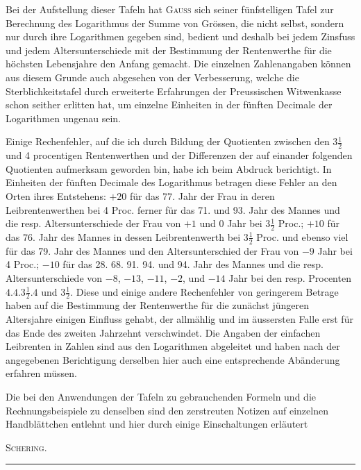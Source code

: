 \noindent\hspace*{1.2em} Bei der Aufstellung dieser Tafeln hat \textsc{Gauss} sich seiner fünfstelligen Tafel zur Berechnung des Logarithmus der Summe von Grössen, die nicht selbst, sondern nur durch ihre Logarithmen gegeben sind, bedient und deshalb bei jedem Zinsfuss und jedem Altersunterschiede mit der Bestimmung der Rentenwerthe für die höchsten Lebensjahre den Anfang gemacht. Die einzelnen Zahlenangaben können aus diesem Grunde auch abgesehen von der Verbesserung, welche die Sterblichkeitstafel durch erweiterte Erfahrungen der Preussischen Witwenkasse schon seither erlitten hat, um einzelne Einheiten in der fünften Decimale der Logarithmen ungenau sein.

Einige Rechenfehler, auf die ich durch Bildung der Quotienten zwischen den \(3\tfrac{1}{2}\) und 4 procentigen Rentenwerthen und der Differenzen der auf einander folgenden Quotienten aufmerksam geworden bin, habe ich beim Abdruck berichtigt. In Einheiten der fünften Decimale des Logarithmus betragen diese Fehler an den Orten ihres Entstehens: \(+20\) für das 77. Jahr der Frau in deren Leibrentenwerthen bei 4 Proc. ferner für das 71. und 93. Jahr des Mannes und die resp. Altersunterschiede der Frau von \(+1\) und 0 Jahr bei \(3\tfrac{1}{2}\) Proc.; \(+10\) für das 76. Jahr des Mannes in dessen Leibrentenwerth bei \(3\tfrac{1}{2}\) Proc. und ebenso viel für das 79. Jahr des Mannes und den Altersunterschied der Frau von \(-9\) Jahr bei 4 Proc.; \(-10\) für das 28. 68. 91. 94. und 94. Jahr des Mannes und die resp. Altersunterschiede von \(-8\), \(-13\), \(-11\), \(-2\), und \(-14\) Jahr bei den resp. Procenten \(4.4.3\tfrac{1}{2}.4\) und \(3\tfrac{1}{2}\). Diese und einige andere Rechenfehler von geringerem Betrage haben auf die Bestimmung der Rentenwerthe für die zunächst jüngeren Altersjahre einigen Einfluss gehabt, der allmählig und im äussersten Falle erst für das Ende des zweiten Jahrzehnt verschwindet. Die Angaben der einfachen Leibrenten in Zahlen sind aus den Logarithmen abgeleitet und haben nach der angegebenen Berichtigung derselben hier auch eine entsprechende Abänderung erfahren müssen.

Die bei den Anwendungen der Tafeln zu gebrauchenden Formeln und die Rechnungsbeispiele zu denselben sind den zerstreuten Notizen auf einzelnen Handblättchen entlehnt und hier durch einige Einschaltungen erläutert
\begin{flushright}\textsc{Schering.}\end{flushright}
\begin{center}\rule{.3\linewidth}{.3pt}\end{center}

